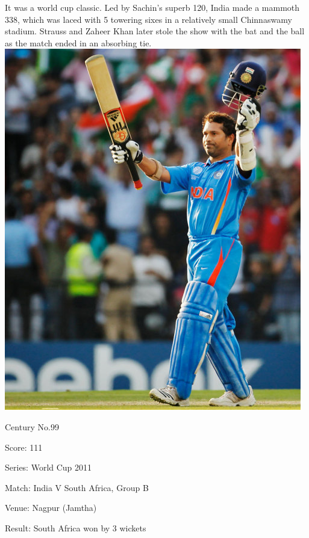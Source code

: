\documentclass[11pt, a4paper]{article}
\begin{document}
It was a world cup classic. Led by Sachin's superb 120, India made a mammoth 338, which was laced with 5 towering sixes in a relatively small Chinnaswamy stadium. Strauss and Zaheer Khan later stole the show with the bat and the ball as the match ended in an absorbing tie.
\newpage
\includegraphics[height=0.7\textheight]{pics/99.jpg}

Century No.99 

Score: 111 

Series: World Cup 2011 

Match: India V South Africa, Group B 

Venue: Nagpur (Jamtha) 

Result: South Africa won by 3 wickets 
\end{document}
